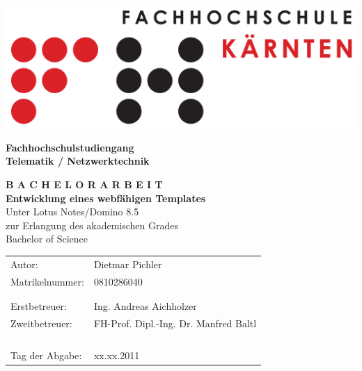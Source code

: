 \begin{titlepage}
\hspace{8cm}
\begin{minipage}[b]{1cm}
\begin{center}
\includegraphics [scale=0.3]{bilder/fhlogo0.png}
\end{center}
\end{minipage}
\hspace{-10cm}
\textbf{Fachhochschulstudiengang\\
Telematik / Netzwerktechnik}
\vspace{2cm}
\begin{center}
{\huge \bfseries B A C H E L O R A R B E I T}\\
\vspace{3.2cm}
\Large{\textbf{Entwicklung eines webf\"ahigen Templates}}\\
\Large{Unter Lotus Notes/Domino 8.5 }\\
\vspace{2.4cm} \normalsize zur Erlangung des akademischen Grades\\
Bachelor of Science
\end{center}
\vspace{1.5cm}
%
%
\begin{tabular}{l l}
Autor: & Dietmar Pichler\\
Matrikelnummer: & 0810286040\\
& \\
& \\
Erstbetreuer: & Ing. Andreas Aichholzer\\
Zweitbetreuer: & FH-Prof. Dipl.-Ing. Dr. Manfred Baltl\\
& \\
& \\
& \\
& \\
Tag der Abgabe: & xx.xx.2011\\
%
%
\end{tabular}
\end{titlepage}
